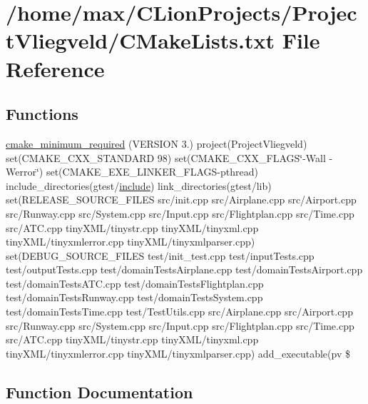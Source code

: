 \hypertarget{CMakeLists_8txt}{}\section{/home/max/\+C\+Lion\+Projects/\+Project\+Vliegveld/\+C\+Make\+Lists.txt File Reference}
\label{CMakeLists_8txt}
\subsection*{Functions}
\begin{DoxyCompactItemize}
\item 
\hyperlink{CMakeLists_8txt_a4ee0a19d17db8f5a8c1aab469d6d8824}{cmake\+\_\+minimum\+\_\+required} (V\+E\+R\+S\+I\+ON 3.) project(Project\+Vliegveld) set(C\+M\+A\+K\+E\+\_\+\+C\+X\+X\+\_\+\+S\+T\+A\+N\+D\+A\+RD 98) set(C\+M\+A\+K\+E\+\_\+\+C\+X\+X\+\_\+\+F\+L\+A\+GS\char`\"{}-\/Wall -\/Werror\char`\"{}) set(C\+M\+A\+K\+E\+\_\+\+E\+X\+E\+\_\+\+L\+I\+N\+K\+E\+R\+\_\+\+F\+L\+A\+GS-\/pthread) include\+\_\+directories(gtest/\hyperlink{CMakeCache_8txt_a986ccfc90e04633694fe6cff5472be19}{include}) link\+\_\+directories(gtest/lib) set(R\+E\+L\+E\+A\+S\+E\+\_\+\+S\+O\+U\+R\+C\+E\+\_\+\+F\+I\+L\+ES src/init.\+cpp src/Airplane.\+cpp src/Airport.\+cpp src/Runway.\+cpp src/System.\+cpp src/Input.\+cpp src/Flightplan.\+cpp src/Time.\+cpp src/A\+T\+C.\+cpp tiny\+X\+ML/tinystr.\+cpp tiny\+X\+ML/tinyxml.\+cpp tiny\+X\+ML/tinyxmlerror.\+cpp tiny\+X\+ML/tinyxmlparser.\+cpp) set(D\+E\+B\+U\+G\+\_\+\+S\+O\+U\+R\+C\+E\+\_\+\+F\+I\+L\+ES test/init\+\_\+test.\+cpp test/input\+Tests.\+cpp test/output\+Tests.\+cpp test/domain\+Tests\+Airplane.\+cpp test/domain\+Tests\+Airport.\+cpp test/domain\+Tests\+A\+T\+C.\+cpp test/domain\+Tests\+Flightplan.\+cpp test/domain\+Tests\+Runway.\+cpp test/domain\+Tests\+System.\+cpp test/domain\+Tests\+Time.\+cpp test/Test\+Utils.\+cpp src/Airplane.\+cpp src/Airport.\+cpp src/Runway.\+cpp src/System.\+cpp src/Input.\+cpp src/Flightplan.\+cpp src/Time.\+cpp src/A\+T\+C.\+cpp tiny\+X\+ML/tinystr.\+cpp tiny\+X\+ML/tinyxml.\+cpp tiny\+X\+ML/tinyxmlerror.\+cpp tiny\+X\+ML/tinyxmlparser.\+cpp) add\+\_\+executable(pv \$
\end{DoxyCompactItemize}


\subsection{Function Documentation}
